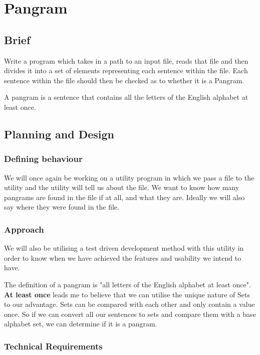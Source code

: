 \section{Pangram}

\subsection{Brief}
Write a program which takes in a path to an input file, reads that file and then divides it into a set of elements representing each sentence within the file. Each sentence within the file should then be checked as to whether it is a Pangram.

A pangram is a sentence that contains all the letters of the English alphabet at least once.

\subsection{Planning and Design}

\subsubsection{Defining behaviour}

We will once again be working on a utility program in which we pass a file
to the utility and the utility will tell us about the file. We want to know how
many pangrams are found in the file if at all, and what they are. Ideally we will
also say where they were found in the file.

\subsubsection{Approach}

We will also be utilising a test driven development method with this utility
in order to know when we have achieved the features and usability we intend to have.

The definition of a pangram is "all letters of the English alphabet at least once". \textbf{At least once}
leads me to believe that we can utilise the unique nature of Sets to our advantage. Sets can be compared
with each other and only contain a value once. So if we can convert all our sentences to sets and compare them with a base
alphabet set, we can determine if it is a pangram.

\subsubsection{Technical Requirements}

